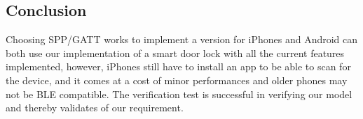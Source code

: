 \subsection{Conclusion}
Choosing SPP/GATT works to implement a version for iPhones and Android can both use our implementation of a smart door lock with all the current features implemented, however, iPhones still have to install an app to be able to scan for the device, and it comes at a cost of minor performances and older phones may not be BLE compatible. The verification test is successful in verifying our model and thereby validates of our requirement.